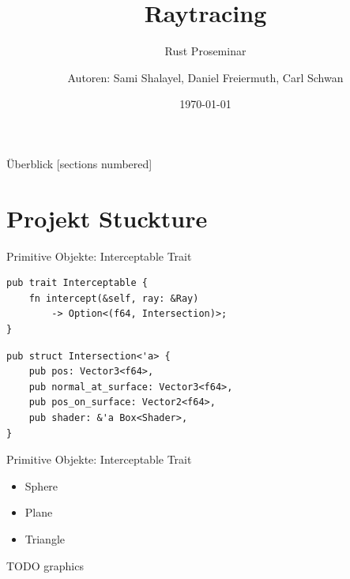 \documentclass{beamer}
\title{Raytracing}
\subtitle{Rust Proseminar}
\author[Sami Shalayel, Daniel Freiermuth, Carl Schwan]{%
    Autoren: Sami Shalayel, Daniel Freiermuth, Carl Schwan}
\institute{Universität des Saarlandes}
\date{\today}
\begin{document}
\maketitle

\begin{frame}{Überblick}
    [sections numbered]
    \tableofcontents[hideallsubsections]
\end{frame}

\section{Projekt Stuckture}
\begin{frame}[fragile]{Primitive Objekte: Interceptable Trait}
    \begin{lstlisting}
pub trait Interceptable {
    fn intercept(&self, ray: &Ray)
        -> Option<(f64, Intersection)>;
}
    \end{lstlisting}
    \begin{lstlisting}
pub struct Intersection<'a> {
    pub pos: Vector3<f64>,
    pub normal_at_surface: Vector3<f64>,
    pub pos_on_surface: Vector2<f64>,
    pub shader: &'a Box<Shader>,
}
    \end{lstlisting}
\end{frame}

\begin{frame}{Primitive Objekte: Interceptable Trait}
    \begin{itemize}
        \item Sphere
        \item Plane
        \item Triangle
    \end{itemize}
    TODO graphics
\end{frame}
\end{document}
